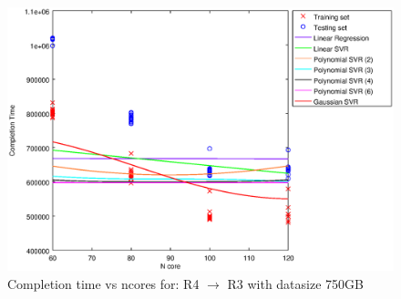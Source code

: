 
\begin {figure}[hbtp]
\centering
\includegraphics[width=\textwidth]{output/R4_R3_750_ALL_FEATURES/plot_R4_R3_750.eps}
\caption{Completion time vs ncores for: R4 $\rightarrow$ R3 with datasize 750GB}
\label{fig:coreonly_linear_R4_R3_750}
\end {figure}
